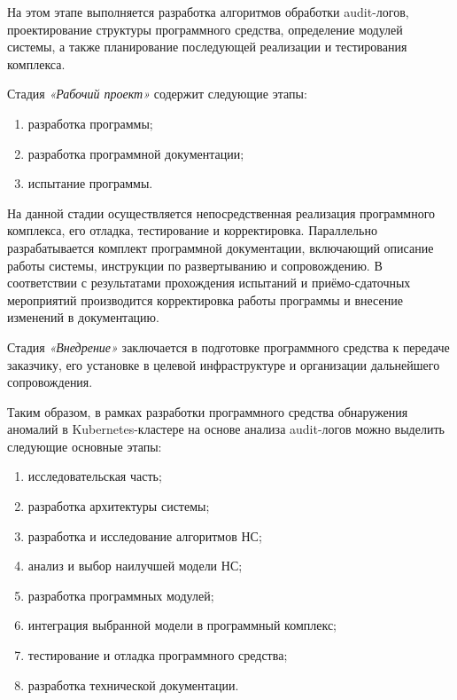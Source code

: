 На этом этапе выполняется разработка алгоритмов обработки audit-логов, проектирование структуры программного средства, определение модулей системы, а также планирование последующей реализации и тестирования комплекса.

Стадия \textit{«Рабочий проект»} содержит следующие этапы:
\begin{enumerate}
    \item разработка программы;
    \item разработка программной документации;
    \item испытание программы.
\end{enumerate}

На данной стадии осуществляется непосредственная реализация программного комплекса, его отладка, тестирование и корректировка. Параллельно разрабатывается комплект программной документации, включающий описание работы системы, инструкции по развертыванию и сопровождению. В соответствии с результатами прохождения испытаний и приёмо-сдаточных мероприятий производится корректировка работы программы и внесение изменений в документацию.

Стадия \textit{«Внедрение»} заключается в подготовке программного средства к передаче заказчику, его установке в целевой инфраструктуре и организации дальнейшего сопровождения.

Таким образом, в рамках разработки программного средства обнаружения аномалий в Kubernetes-кластере на основе анализа audit-логов можно выделить следующие основные этапы:

\begin{enumerate}
    \item исследовательская часть;
    \item разработка архитектуры системы;
    \item разработка и исследование алгоритмов НС;
    \item анализ и выбор наилучшей модели НС;
    \item разработка программных модулей;
    \item интеграция выбранной модели в программный комплекс;
    \item тестирование и отладка программного средства;
    \item разработка технической документации.
\end{enumerate}
